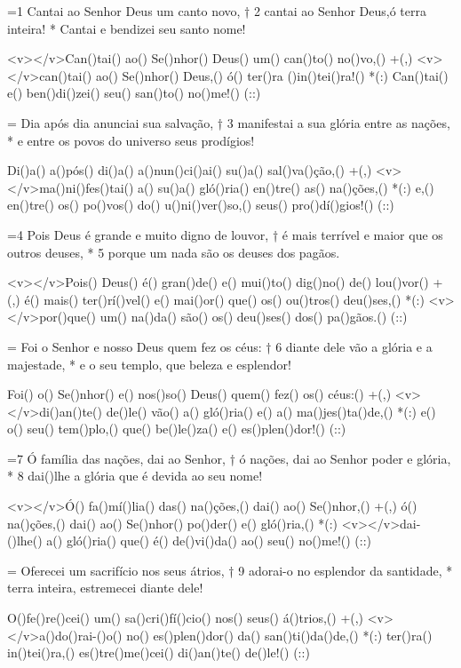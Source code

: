 =1 Cantai ao Senhor Deus um canto novo, †
2 cantai ao Senhor Deus,ó terra inteira! *
Cantai e bendizei seu santo nome!

<v></v>Can()tai() ao() Se()nhor() Deus() um() can()to() no()vo,() +(,)
<v></v>can()tai() ao() Se()nhor() Deus,() ó() ter()ra ()in()tei()ra!() *(:)
Can()tai() e() ben()di()zei() seu() san()to() no()me!() (::)

= Dia após dia anunciai sua salvação, †
3 manifestai a sua glória entre as nações, *
e entre os povos do universo seus prodígios!

Di()a() a()pós() di()a() a()nun()ci()ai() su()a() sal()va()ção,() +(,)
<v></v>ma()ni()fes()tai() a() su()a() gló()ria() en()tre() as() na()ções,() *(:)
e,() en()tre() os() po()vos() do() u()ni()ver()so,() seus() pro()dí()gios!() (::)

=4 Pois Deus é grande e muito digno de louvor, †
é mais terrível e maior que os outros deuses, *
5 porque um nada são os deuses dos pagãos.

<v></v>Pois() Deus() é() gran()de() e() mui()to() dig()no() de() lou()vor() +(,)
é() mais() ter()rí()vel() e() mai()or() que() os() ou()tros() deu()ses,() *(:)
<v></v>por()que() um() na()da() são() os() deu()ses() dos() pa()gãos.() (::)

= Foi o Senhor e nosso Deus quem fez os céus: †
6 diante dele vão a glória e a majestade, *
e o seu templo, que beleza e esplendor!

Foi() o() Se()nhor() e() nos()so() Deus() quem() fez() os() céus:() +(,)
<v></v>di()an()te() de()le() vão() a() gló()ria() e() a() ma()jes()ta()de,() *(:)
e() o() seu() tem()plo,() que() be()le()za() e() es()plen()dor!() (::)

=7 Ó família das nações, dai ao Senhor, †
ó nações, dai ao Senhor poder e glória, *
8 dai()lhe a glória que é devida ao seu nome!

<v></v>Ó() fa()mí()lia() das() na()ções,() dai() ao() Se()nhor,() +(,)
ó() na()ções,() dai() ao() Se()nhor() po()der() e() gló()ria,() *(:)
<v></v>dai-()lhe() a() gló()ria() que() é() de()vi()da() ao() seu() no()me!() (::)

= Oferecei um sacrifício nos seus átrios, †
9 adorai-o no esplendor da santidade, *
terra inteira, estremecei diante dele!

O()fe()re()cei() um() sa()cri()fí()cio() nos() seus() á()trios,() +(,)
<v></v>a()do()rai-()o() no() es()plen()dor() da() san()ti()da()de,() *(:)
ter()ra() in()tei()ra,() es()tre()me()cei() di()an()te() de()le!() (::)

